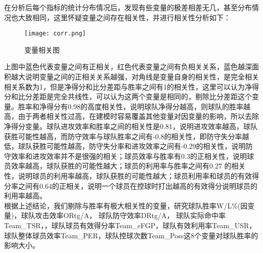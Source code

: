 在分析后每个指标的统计分布情况后，发现有些变量的极差相差无几，甚至分布情况也大致相同，这里怀疑变量之间存在相关性，并进行相关性分析如下：

\begin{figure}[h!]
	\centering
	\texttt{[image: corr.png]}\label{fig:16}
	\centering
	\caption{变量相关图}
\end{figure}

上图中蓝色代表变量之间有正相关，红色代表变量之间有负相关关系，蓝色越深面积越大说明变量之间的正相关关系越强，对角线是变量自身的相关性，是完全相关相关系数为1，但是净得分和比分差距与胜率之间有1的相关性，这里可以认为净得分和比分差距是完全共线性，可以认为这两个变量是相同的，剔除比分差距这个变量。胜率和净得分有0.98的高度相关性，说明球队净得分越高，则球队的胜率越高，由于两者相关性过高，在建模时容易覆盖其他变量对因变量的影响，所以去除净得分变量。球队进攻效率和胜率之间的相关性是0.81，说明进攻效率越高，球队获胜可能性越高，而防守效率与球队胜率之间有-0.8的相关性，即防守失分率越低，球队获胜可能性越高，防守失分率和进攻效率之间有-0.29的相关性，说明防守效率和进攻效率并不是很强的相关；球员效率与胜率有0.3的正相关性，说明球员效率越高，球队获胜的可能性越大；球员的利用率与胜率之间有0.27 的相关性，说明球员的利用率越高，球队获胜的可能性越大；球员利用率和球员的有效得分率之间有0.64的正相关，说明一个球员在控球时打出越高的有效得分说明球员的利用率越高。
\\

根据上述结论，我们剔除与胜率有极大相关性的变量，研究球队胜率W/L\%(因变量)，球队攻击效率ORtg/A， 球队防守效率DRtg/A， 球队实际命中率Team\_TSR，，球队球员有效得分率Team\_eFGP，球队有效利用率Team\_USR，球队整体球员效率Team\_PER，球队控球次数Team\_Poss这8个变量对球队胜率的影响大小。
